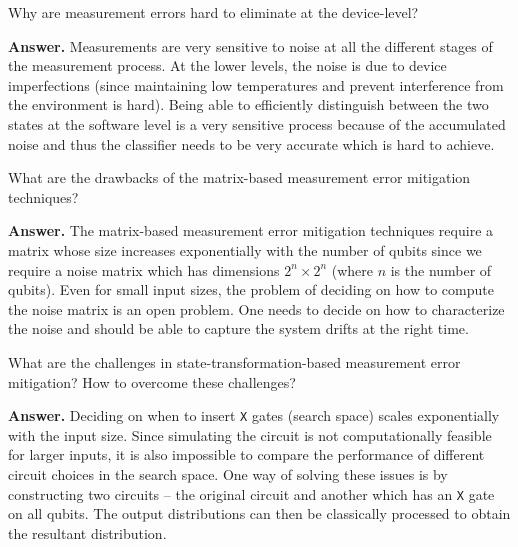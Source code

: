 \begin{question}
    Why are measurement errors hard to eliminate at the device-level?
\end{question}
\textbf{Answer.} Measurements are very sensitive to noise at all the different stages of the measurement process. At the lower levels, the noise is due to device imperfections (since maintaining low temperatures and prevent interference from the environment is hard). Being able to efficiently distinguish between the two states at the software level is a very sensitive process because of the accumulated noise and thus the classifier needs to be very accurate which is hard to achieve.

\tcbline{}

\begin{question}
    What are the drawbacks of the matrix-based measurement error mitigation techniques?
\end{question}
\textbf{Answer.} The matrix-based measurement error mitigation techniques require a matrix whose size increases exponentially with the number of qubits since we require a noise matrix which has dimensions $2^n\times 2^n$ (where $n$ is the number of qubits). Even for small input sizes, the problem of deciding on how to compute the noise matrix is an open problem. One needs to decide on how to characterize the noise and should be able to capture the system drifts at the right time.

\tcbline{}

\begin{question}
    What are the challenges in state-transformation-based measurement error mitigation? How to overcome these challenges?
\end{question}
\textbf{Answer.} Deciding on when to insert \texttt{X} gates (search space) scales exponentially with the input size. Since simulating the circuit is not computationally feasible for larger inputs, it is also impossible to compare the performance of different circuit choices in the search space. One way of solving these issues is by constructing two circuits -- the original circuit and another which has an \texttt{X} gate on all qubits. The output distributions can then be classically processed to obtain the resultant distribution.

\tcbline{}

